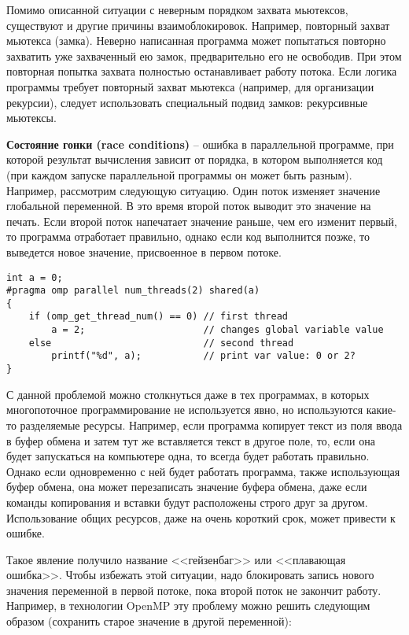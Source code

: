 Помимо описанной ситуации с неверным порядком захвата мьютексов, существуют и другие причины взаимоблокировок. Например, повторный захват мьютекса (замка). Неверно написанная программа может попытаться повторно захватить уже захваченный ею замок, предварительно его не освободив. При этом повторная попытка захвата полностью останавливает работу потока. Если логика программы требует повторный захват мьютекса (например, для организации рекурсии), следует использовать специальный подвид замков: рекурсивные мьютексы.

\textbf{Состояние гонки (race conditions)} -- ошибка в параллельной программе, при которой результат вычисления зависит от порядка, в котором выполняется код (при каждом запуске параллельной программы он может быть разным). Например, рассмотрим следующую ситуацию. Один поток изменяет значение глобальной переменной. В это время второй поток выводит это значение на печать. Если второй поток напечатает значение раньше, чем его изменит первый, то программа отработает правильно, однако если код выполнится позже, то выведется новое значение, присвоенное в первом потоке.

\begin{verbatim}
int a = 0;
#pragma omp parallel num_threads(2) shared(a)
{
    if (omp_get_thread_num() == 0) // first thread 
        a = 2;                     // changes global variable value
    else                           // second thread 
        printf("%d", a);           // print var value: 0 or 2?
}
\end{verbatim}

С данной проблемой можно столкнуться даже в тех программах, в которых многопоточное программирование не используется явно, но используются какие-то разделяемые ресурсы. Например, если программа копирует текст из поля ввода в буфер обмена и затем тут же вставляется текст в другое поле, то, если она будет запускаться на компьютере одна, то всегда будет работать правильно. Однако если одновременно с ней будет работать программа, также использующая буфер обмена, она может перезаписать значение буфера обмена, даже если команды копирования и вставки будут расположены строго друг за другом. Использование общих ресурсов, даже на очень короткий срок, может привести к ошибке.

Такое явление получило название <<гейзенбаг>> или <<плавающая ошибка>>. Чтобы избежать этой ситуации, надо блокировать запись нового значения переменной в первой потоке, пока второй поток не закончит работу. Например, в технологии OpenMP эту проблему можно решить следующим образом (сохранить старое значение в другой переменной):

